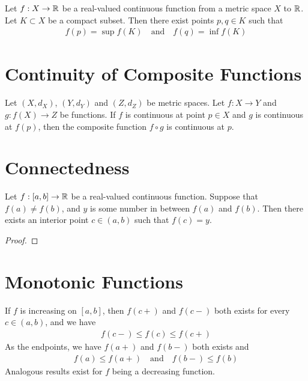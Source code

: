 \documentclass[thmcnt=section, 12pt]{my-elegantbook}
\begin{document}

\begin{theorem} \label{thm:6}
    Let $f: X \to \mathbb{R}$ be a real-valued continuous function from a metric space $X$ to $\mathbb{R}$. Let $K \subset X$ be a compact subset. Then there exist points $p, q \in K$ such that 
    \begin{align*}
        f(p) = \sup f(K)
        \quad \text{and} \quad
        f(q) = \inf f(K)
    \end{align*}
\end{theorem}


\section{Continuity of Composite Functions}

\begin{theorem} \label{thm:41}
    Let $(X, d_X)$, $(Y, d_Y)$ and $(Z, d_Z)$ be metric spaces. Let $f: X \to Y$ and $g: f(X) \to Z$ be functions. If $f$ is continuous at point $p \in X$ and $g$ is continuous at $f(p)$, then the composite function $f \circ g$ is continuous at $p$.
\end{theorem}


\section{Connectedness}

\begin{theorem} \label{thm:11}
    Let $f: [a, b] \to \mathbb{R}$ be a real-valued continuous function. Suppose that $f(a) \neq f(b)$, and $y$ is some number in between $f(a)$ and $f(b)$. Then there exists an interior point $c \in (a, b)$ such that $f(c) = y$.
\end{theorem}

\begin{proof}
\end{proof}


\section{Monotonic Functions}

\begin{theorem} \label{thm:15}
    If $f$ is increasing on $[a, b]$, then $f(c+)$ and $f(c-)$ both exists for every $c \in (a, b)$, and we have
    \begin{align*}
        f(c-) \leq f(c) \leq f(c+) 
    \end{align*}
    As the endpoints, we have $f(a+)$ and $f(b-)$ both exists and 
    \begin{align}
        f(a) \leq f(a+)
        \quad \text{and} \quad 
        f(b-) \leq f(b)
        \label{eq:18}
    \end{align}
    Analogous results exist for $f$ being a decreasing function.
\end{theorem}
\end{document}
